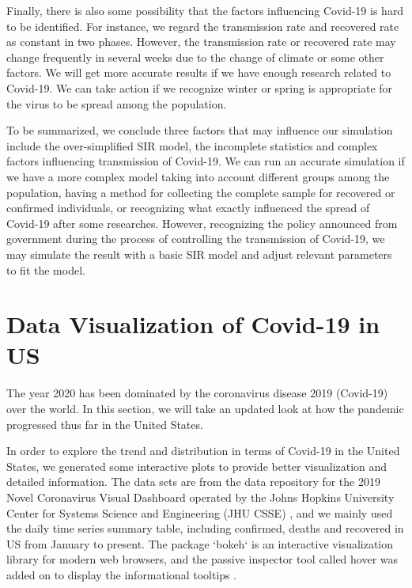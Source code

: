\documentclass{article}
\begin{document}
Finally, there is also some possibility that the factors influencing Covid-19 is hard to be identified. For instance, we regard the transmission rate and recovered rate as constant in two phases. However, the transmission rate or recovered rate may change frequently in several weeks due to the change of climate or some other factors. We will get more accurate results if we have enough research related to Covid-19. We can take action if we recognize winter or spring is appropriate for the virus to be spread among the population.


To be summarized, we conclude three factors that may influence our simulation include the over-simplified SIR model, the incomplete statistics and complex factors influencing transmission of Covid-19. We can run an accurate simulation if we have a more complex model taking into account different groups among the population, having a method for collecting the complete sample for recovered or confirmed individuals, or recognizing what exactly influenced the spread of Covid-19 after some researches. However, recognizing the policy announced from government during the process of controlling the transmission of Covid-19, we may simulate the result with a basic SIR model and adjust relevant parameters to fit the model. 










\section{Data Visualization of Covid-19 in US}

The year 2020 has been dominated by the coronavirus disease 2019 (Covid-19) over the world. In this section, we will take an updated look at how the pandemic progressed thus far in the United States.


In order to explore the trend and distribution in terms of Covid-19 in the United States, we generated some interactive plots to provide better visualization and detailed information. The data sets are from the data repository for the 2019 Novel Coronavirus Visual Dashboard operated by the Johns Hopkins University Center for Systems Science and Engineering (JHU CSSE) \cite{Johnhopkins}, and we mainly used the daily time series summary table, including confirmed, deaths and recovered in US from January to present. The package `bokeh` is an interactive visualization library for modern web browsers, and the passive inspector tool called hover was added on to display the informational tooltips \cite{bokeh}. 
\end{document}
